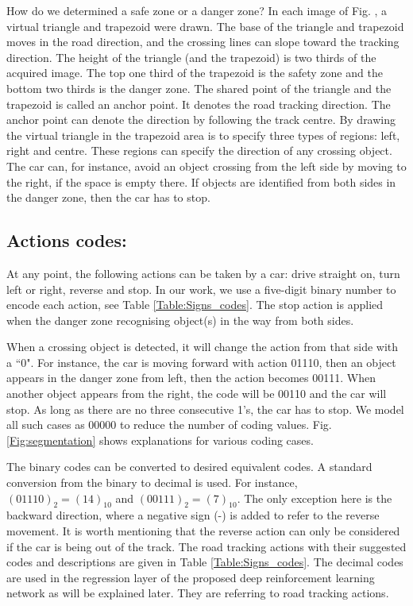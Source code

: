 How do we determined a safe zone or a danger zone? In each image of Fig. \label{Fig:segmentation_regions1}, a virtual triangle and trapezoid were drawn. The base of the triangle and trapezoid moves in the road direction, and the crossing lines can slope toward the tracking direction. The height of the triangle (and the trapezoid) is two thirds of the acquired image. The top one third of the trapezoid is the safety zone and the bottom two thirds is the danger zone. The shared point of the triangle and the trapezoid is called an anchor point. It denotes the road tracking direction. The anchor point can denote the direction by following the track centre. By drawing the virtual triangle in the trapezoid area is to specify three types of regions: left, right and centre. These regions can specify the direction of any crossing object. The car can, for instance, avoid an object crossing from the left side by moving to the right, if the space is empty there. If objects are identified from both sides in the danger zone, then the car has to stop.  

\subsection{Actions codes:} 
At any point, the following actions can be taken by a car: drive straight on, turn left or right, reverse and stop. In our work, we use a five-digit binary number to encode each action, see Table \ref{Table:Signs_codes}. The stop action is applied when the danger zone recognising object(s) in the way from both sides. 

When a crossing object is detected, it will change the action from that side with a ``0". For instance, the car is moving forward with action 01110, then an object appears in the danger zone from left, then the action becomes 00111. When another object appears from the right, the code will be 00110 and the car will stop. As long as there are no three consecutive 1's, the car has to stop.  We model all such cases as 00000 to reduce the number of coding values. Fig. \ref{Fig:segmentation} shows explanations for various coding cases.

The binary codes can be converted to desired equivalent codes. A standard conversion from the binary to decimal \cite{koren2001computer} is used. For instance, $(01110)_2=(14)_{10}$ and $(00111)_2=(7)_{10}$. The only exception here is the backward direction, where a negative sign (-) is added to refer to the reverse movement. It is worth mentioning that the reverse action can only be considered if the car is being out of the track. The road tracking actions with their suggested codes and descriptions are given in Table \ref{Table:Signs_codes}. The decimal codes are used in the regression layer of the proposed deep reinforcement learning network as will be explained later. They are referring to road tracking actions.

